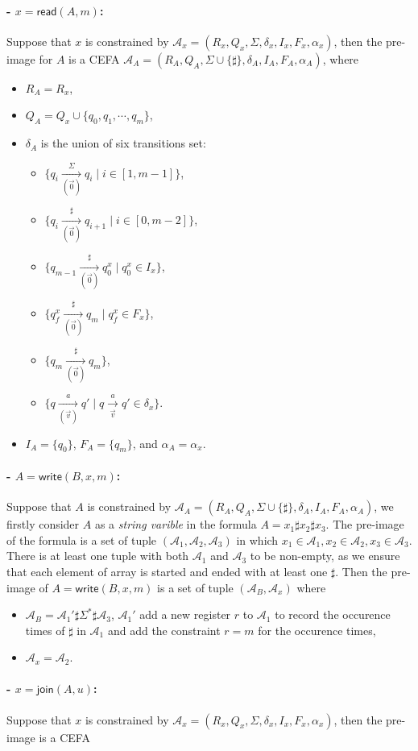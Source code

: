 \documentclass[12pt]{article}
\newcommand*{\aut}{\mathcal{A}}
\newcommand*{\myvec}[1]{\vec{#1}}
\newcommand{\arrconcat}{\sharp}
\newcommand{\myjoin}{\mathsf{join}}
\newcommand{\myread}{\mathsf{read}}
\newcommand{\mywrite}{\mathsf{write}}
\newcommand{\myset}[1]{\{#1\}}
\theoremstyle{remark}
\begin{document}
\paragraph{- $x = \myread(A, m)$:} Suppose that $x$ is constrained by $\aut_x=(R_x, Q_x, \Sigma, \delta_x, I_x, F_x, \alpha_x)$, then the pre-image for $A$ is a CEFA $\aut_A=(R_A, Q_A, \Sigma\cup\{\arrconcat\}, \delta_A, I_A, F_A, \alpha_A)$, where
\begin{itemize}
    \item $R_A = R_x$,
    \item $Q_A = Q_x\cup\myset{q_0, q_1, \cdots, q_{m}}$,
    \item $\delta_A$ is the union of six transitions set:
          \begin{itemize}
              \item $\myset{q_i\xrightarrow[(\myvec{0})]{\Sigma}q_i\mid i\in [1,m-1]}$,
              \item $\myset{q_i\xrightarrow[(\myvec{0})]{\arrconcat}q_{i+1}\mid i\in[0,m-2]}$,
              \item $\myset{q_{m-1}\xrightarrow[(\myvec{0})]{\arrconcat}q_0^x \mid q_0^x\in I_x}$,
              \item $\myset{q_f^x\xrightarrow[(\myvec{0})]{\arrconcat}q_m \mid q_f^x\in F_x}$,
              \item $\myset{q_m\xrightarrow[(\myvec{0})]{\arrconcat}q_m}$,
              \item $\myset{q\xrightarrow[(\myvec{v})]{a}q'\mid q\xrightarrow[\myvec{v}]{a}q'\in \delta_x}$.
          \end{itemize}
    \item $I_A = \myset{q_0}$, $F_A = \myset{q_m}$, and $\alpha_A = \alpha_x$.
\end{itemize}

\paragraph{- $A = \mywrite(B, x, m)$:} Suppose that $A$ is constrained by $\aut_A=(R_A, Q_A, \Sigma\cup\{\arrconcat\}, \delta_A, I_A, F_A, \alpha_A)$, we firstly consider $A$ as a \emph{string varible} in the formula $A = x_1\arrconcat x_2\arrconcat x_3$. The pre-image of the formula is a set of tuple $(\aut_1, \aut_2, \aut_3)$ in which $x_1\in \aut_1, x_2\in \aut_2, x_3\in \aut_3$. There is at least one tuple with both $\aut_1$ and $\aut_3$ to be non-empty, as we ensure that each element of array is started and ended with at least one $\arrconcat$. Then the pre-image of $A = \mywrite(B, x, m)$ is a set of tuple $(\aut_B, \aut_x)$ where
\begin{itemize}
    \item $\aut_B = \aut_1'\arrconcat\Sigma^*\arrconcat\aut_3$, $\aut_1'$ add a new register $r$ to $\aut_1$ to record the occurence times of $\arrconcat$ in $\aut_1$ and add the constraint $r = m$ for the occurence times,
    \item $\aut_x = \aut_2$.
\end{itemize}

\paragraph{- $x = \myjoin(A,u)$:} Suppose that $x$ is constrained by $\aut_x=(R_x, Q_x, \Sigma, \delta_x, I_x, F_x, \alpha_x)$, then the pre-image is a CEFA
\end{document}
